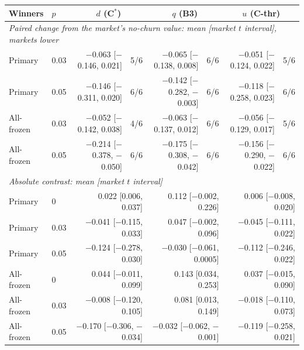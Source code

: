\begin{tabular}{llrrrrrr}
\toprule
Winners & $p$ & \multicolumn{2}{c}{$d$ (C$^*$)} & \multicolumn{2}{c}{$q$ (B3)} & \multicolumn{2}{c}{$u$ (C-thr)} \\
\midrule
\multicolumn{8}{l}{\emph{Paired change from the market's no-churn value: mean [market $t$ interval], markets lower}} \\
Primary & 0.03 & $-$0.063 [$-$0.146, 0.021] & 5/6 & $-$0.065 [$-$0.138, 0.008] & 6/6 & $-$0.051 [$-$0.124, 0.022] & 5/6 \\
Primary & 0.05 & $-$0.146 [$-$0.311, 0.020] & 6/6 & $-$0.142 [$-$0.282, $-$0.003] & 6/6 & $-$0.118 [$-$0.258, 0.023] & 6/6 \\
All-frozen & 0.03 & $-$0.052 [$-$0.142, 0.038] & 4/6 & $-$0.063 [$-$0.137, 0.012] & 6/6 & $-$0.056 [$-$0.129, 0.017] & 5/6 \\
All-frozen & 0.05 & $-$0.214 [$-$0.378, $-$0.050] & 6/6 & $-$0.175 [$-$0.308, $-$0.042] & 6/6 & $-$0.156 [$-$0.290, $-$0.022] & 6/6 \\
\midrule
\multicolumn{8}{l}{\emph{Absolute contrast: mean [market $t$ interval]}} \\
Primary & 0 & \multicolumn{2}{r}{0.022 [0.006, 0.037]} & \multicolumn{2}{r}{0.112 [$-$0.002, 0.226]} & \multicolumn{2}{r}{0.006 [$-$0.008, 0.020]} \\
Primary & 0.03 & \multicolumn{2}{r}{$-$0.041 [$-$0.115, 0.033]} & \multicolumn{2}{r}{0.047 [$-$0.002, 0.096]} & \multicolumn{2}{r}{$-$0.045 [$-$0.111, 0.022]} \\
Primary & 0.05 & \multicolumn{2}{r}{$-$0.124 [$-$0.278, 0.030]} & \multicolumn{2}{r}{$-$0.030 [$-$0.061, 0.0005]} & \multicolumn{2}{r}{$-$0.112 [$-$0.246, 0.022]} \\
All-frozen & 0 & \multicolumn{2}{r}{0.044 [$-$0.011, 0.099]} & \multicolumn{2}{r}{0.143 [0.034, 0.253]} & \multicolumn{2}{r}{0.037 [$-$0.015, 0.090]} \\
All-frozen & 0.03 & \multicolumn{2}{r}{$-$0.008 [$-$0.120, 0.105]} & \multicolumn{2}{r}{0.081 [0.013, 0.149]} & \multicolumn{2}{r}{$-$0.018 [$-$0.110, 0.073]} \\
All-frozen & 0.05 & \multicolumn{2}{r}{$-$0.170 [$-$0.306, $-$0.034]} & \multicolumn{2}{r}{$-$0.032 [$-$0.062, $-$0.001]} & \multicolumn{2}{r}{$-$0.119 [$-$0.258, 0.021]} \\
\bottomrule
\end{tabular}
